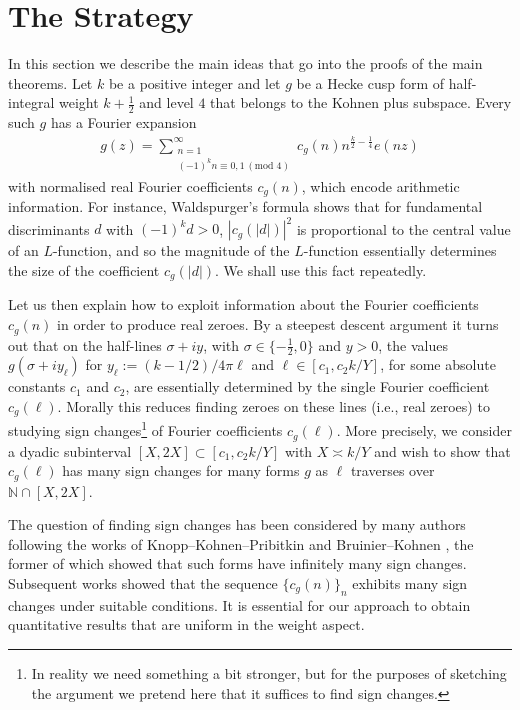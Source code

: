 \documentclass[a4paper,10pt,twoside]{amsart}
\theoremstyle{definition}
\numberwithin{equation}{section}
\renewcommand\:{\colon}
\begin{document}
\section{The Strategy}   

\noindent In this section we describe the main ideas that go into the proofs of the main theorems. Let $k$ be a positive integer and let $g$ be a Hecke cusp form of half-integral weight $k+\frac12$ and level $4$ that belongs to the Kohnen plus subspace.  Every such $g$ has a Fourier expansion
\begin{align*}
g(z)=\sum_{\substack{n=1\\
(-1)^k n\equiv 0,1\,(\text{mod }4)}}^\infty c_g(n)n^{\frac k2-\frac14}e(nz)\end{align*}
with normalised real Fourier coefficients $c_g(n)$, which encode arithmetic information. For instance, Waldspurger's formula shows that for fundamental discriminants $d$ with $(-1)^kd>0$, $|c_g(|d|)|^2$ is proportional to the central value of an $L$-function, and so the magnitude of the $L$-function essentially determines the size of the coefficient $c_g(|d|)$. We shall use this fact repeatedly. 

Let us then explain how to exploit information about the Fourier coefficients $c_g(n)$ in order to produce real zeroes. By a steepest descent argument it turns out that on the half-lines $\sigma+iy$, with $\sigma\in\{-\frac12,0\}$ and $y>0$, the values $g(\sigma+iy_\ell)$ for $y_\ell:=(k-1/2)/4\pi\ell$ and $\ell\in[c_1,c_2k/Y]$, for some absolute constants $c_1$ and $c_2$, are essentially determined by the single Fourier coefficient $c_g(\ell)$. Morally this reduces finding zeroes on these lines (i.e., real zeroes) to studying sign changes\footnote{In reality we need something a bit stronger, but for the purposes of sketching the argument we pretend here that it suffices to find sign changes.} of Fourier coefficients $c_g(\ell)$. More precisely, we consider a dyadic subinterval $[X,2X]\subset[c_1,c_2k/Y]$ with $X\asymp k/Y$ and wish to show that $c_g(\ell)$ has many sign changes for many forms $g$ as $\ell$ traverses over $\mathbb N\cap[X,2X]$.

The question of finding sign changes has been considered by many authors following the works of Knopp--Kohnen--Pribitkin \cite{KKP2003} and Bruinier--Kohnen \cite{Bruinier-Kohnen2008}, the former of which showed that such forms have infinitely many sign changes. Subsequent works \cite{HKKL2012, Kohnen-Lau-Wu2013, Lau-Royer-Wu2016} showed that the sequence $\{c_g(n)\}_n$ exhibits many sign changes under suitable conditions. It is essential for our approach to obtain quantitative results that are uniform in the weight aspect.   
\end{document}
